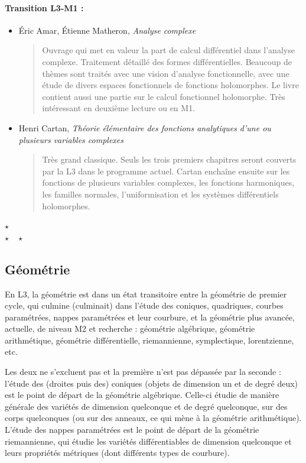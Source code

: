\documentclass{article}
\def\separateur{\begin{center}
$\star$\\
$\star\quad\star$
\end{center}}
\begin{document}
\paragraph{Transition L3-M1 :}
\begin{itemize}
\item Éric Amar, Étienne Matheron, \emph{Analyse complexe}
\begin{quote}
Ouvrage qui met en valeur la part de calcul différentiel dans l'analyse complexe. Traitement détaillé des formes différentielles. Beaucoup de thèmes sont traités avec une vision d'analyse fonctionnelle, avec une étude de divers espaces fonctionnels de fonctions holomorphes. Le livre contient aussi une partie sur le calcul fonctionnel holomorphe. Très intéressant en deuxième lecture ou en M1.
\end{quote}
\item Henri Cartan, \emph{Théorie élémentaire des fonctions analytiques d'une ou plusieurs variables complexes}
\begin{quote}
Très grand classique. Seuls les trois premiers chapitres seront couverts par la L3 dans le programme actuel. Cartan enchaîne ensuite sur les fonctions de plusieurs variables complexes, les fonctions harmoniques, les familles normales, l'uniformisation et les systèmes différentiels holomorphes.
\end{quote}
\end{itemize}

\separateur
\subsection{Géométrie}

En L3, la géométrie est dans un état transitoire entre la géométrie de premier cycle, qui culmine (culminait) dans l'étude des coniques, quadriques, courbes paramétrées, nappes paramétrées et leur courbure, et la géométrie plus avancée, actuelle, de niveau M2 et recherche : géométrie algébrique, géométrie arithmétique, géométrie différentielle, riemannienne, symplectique, lorentzienne, etc.

Les deux ne s'excluent pas et la première n'est pas \og dépassée\fg{} par la seconde : l'étude des (droites puis des) coniques (objets de dimension un et de degré deux) est le point de départ de la géométrie algébrique. Celle-ci étudie de manière générale des variétés de dimension quelconque et de degré quelconque, sur des corps quelconques (ou sur des anneaux, ce qui mène à la géométrie arithmétique). L'étude des nappes paramétrées est le point de départ de la géométrie riemannienne, qui étudie les variétés différentiables de dimension quelconque et leurs propriétés métriques (dont différents types de courbure).
\end{document}
